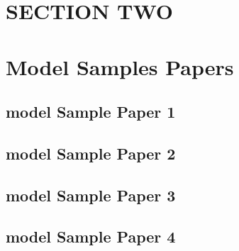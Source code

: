\documentclass[
  letterpaper,
  DIV=11,
  numbers=noendperiod]{scrreprt}
\begin{document}

\hypertarget{section-two}{%
\chapter*{SECTION TWO}\label{section-two}}



\hypertarget{model-samples-papers}{%
\chapter*{Model Samples Papers}\label{model-samples-papers}}


\hypertarget{model-sample-paper-1}{%
\section*{model Sample Paper 1}\label{model-sample-paper-1}}


\hypertarget{model-sample-paper-2}{%
\section*{model Sample Paper 2}\label{model-sample-paper-2}}


\hypertarget{model-sample-paper-3}{%
\section*{model Sample Paper 3}\label{model-sample-paper-3}}


\hypertarget{model-sample-paper-4}{%
\section*{model Sample Paper 4}\label{model-sample-paper-4}}
\end{document}

